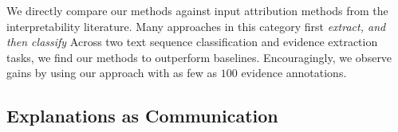 \documentclass{article}
\begin{document}

We directly compare our methods against
input attribution methods 
from the interpretability literature.
Many approaches in this category
first \emph{extract, and then classify}%
% 
% 
Across two text sequence classification 
and evidence extraction tasks,
we find our methods to outperform 
baselines. Encouragingly, 
we observe gains by using our approach 
with as few as $100$ evidence annotations.



\subsection{Explanations as Communication}
\label{communication}
\end{document}
